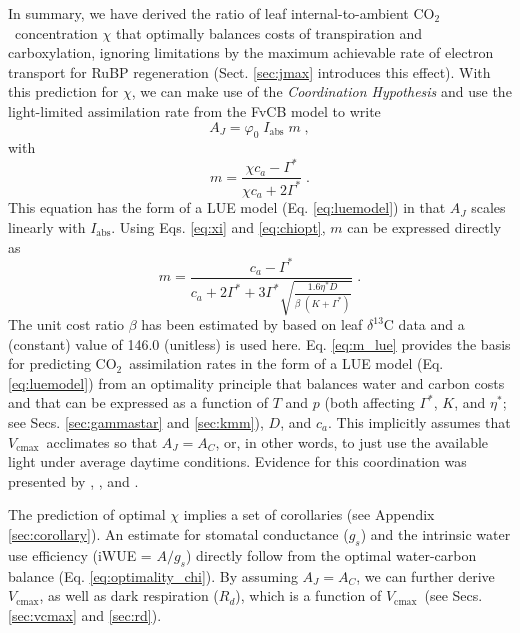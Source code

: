 \documentclass[gmd, manuscript]{copernicus}
\newcommand{\coo}{CO$_2$}
\newcommand{\vcmax}{$V_{\text{cmax}}$}
\begin{document}
In summary, we have derived the ratio of leaf internal-to-ambient \coo\ concentration $\chi$ that optimally balances costs of transpiration and carboxylation, ignoring limitations by the maximum achievable rate of electron transport for RuBP regeneration (Sect. \ref{sec:jmax} introduces this effect). With this prediction for $\chi$, we can make use of the \textit{Coordination Hypothesis} and use the light-limited assimilation rate from the FvCB model to write
\begin{equation}
\label{eq:aj}
        A_J = \varphi_0 \; I_{\mathrm{abs}}\;m \;,
\end{equation}
with
\begin{equation}
\label{eq:m_co2limitation}
    m = \frac{\chi c_a - \Gamma^{\ast}}{\chi c_a + 2\Gamma^{\ast}}\;.
\end{equation}
This equation has the form of a LUE model (Eq. \ref{eq:luemodel}) in that $A_J$ scales linearly with $I_{\mathrm{abs}}$. Using Eqs. \ref{eq:xi} and \ref{eq:chiopt}, $m$ can be expressed directly as
\begin{equation}
\label{eq:m_lue}
    m = \frac{c_a - \Gamma^{\ast}}{c_a + 2 \Gamma^{\ast} + 3 \Gamma^{\ast} \sqrt{\frac{1.6 \eta^{\ast} D }{\beta\;(K+\Gamma^{\ast})}}} \;.
\end{equation}
The unit cost ratio $\beta$ has been estimated by \citet{wang17natpl} based on leaf $\delta^{13}$C data and a (constant) value of 146.0 (unitless) is used here. Eq. \ref{eq:m_lue} provides the basis for predicting \coo\ assimilation rates in the form of a LUE model (Eq. \ref{eq:luemodel}) from an optimality principle that balances water and carbon costs and that can be expressed as a function of $T$ and $p$ (both affecting $\Gamma^{\ast}$, $K$, and $\eta^\ast$; see Secs. \ref{sec:gammastar} and \ref{sec:kmm}), $D$, and $c_a$. This implicitly assumes that \vcmax\ acclimates so that $A_J=A_C$, or, in other words, to just use the available light under average daytime conditions. Evidence for this coordination was presented by \citet{chen93}, \citet{haxeltine96}, and \citet{maire12po}. 

The prediction of optimal $\chi$ implies a set of corollaries (see Appendix \ref{sec:corollary}). An estimate for stomatal conductance ($g_s$) and the intrinsic water use efficiency (iWUE = $A/g_s$) directly follow from the optimal water-carbon balance (Eq. \ref{eq:optimality_chi}). By assuming $A_J=A_C$, we can further derive \vcmax , as well as dark respiration ($R_d$), which is a function of \vcmax\ (see Secs. \ref{sec:vcmax} and \ref{sec:rd}).
\end{document}
